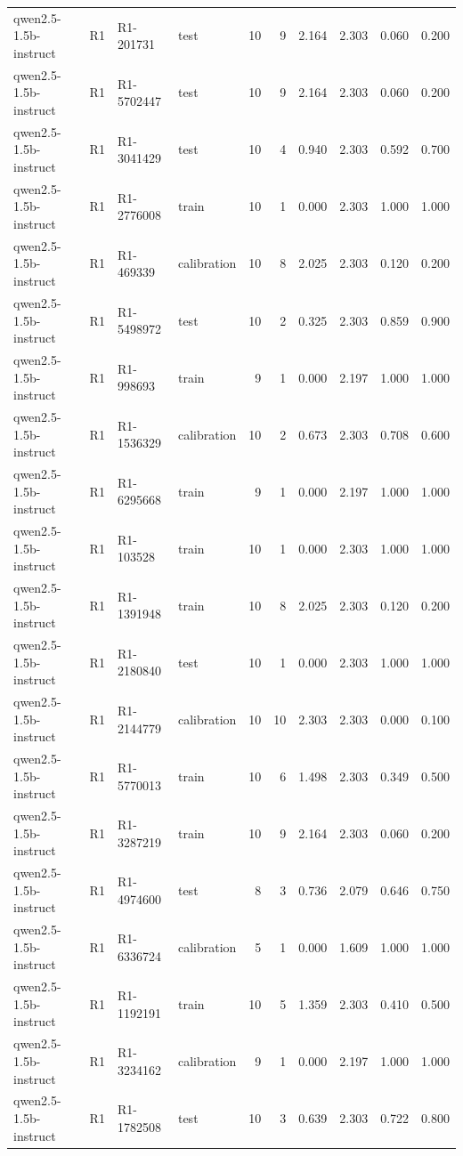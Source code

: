 \begin{table}
\begin{tabular}{llllrrrrrr}
qwen2.5-1.5b-instruct & R1 & R1-201731 & test & 10 & 9 & 2.164 & 2.303 & 0.060 & 0.200 \\
qwen2.5-1.5b-instruct & R1 & R1-5702447 & test & 10 & 9 & 2.164 & 2.303 & 0.060 & 0.200 \\
qwen2.5-1.5b-instruct & R1 & R1-3041429 & test & 10 & 4 & 0.940 & 2.303 & 0.592 & 0.700 \\
qwen2.5-1.5b-instruct & R1 & R1-2776008 & train & 10 & 1 & 0.000 & 2.303 & 1.000 & 1.000 \\
qwen2.5-1.5b-instruct & R1 & R1-469339 & calibration & 10 & 8 & 2.025 & 2.303 & 0.120 & 0.200 \\
qwen2.5-1.5b-instruct & R1 & R1-5498972 & test & 10 & 2 & 0.325 & 2.303 & 0.859 & 0.900 \\
qwen2.5-1.5b-instruct & R1 & R1-998693 & train & 9 & 1 & 0.000 & 2.197 & 1.000 & 1.000 \\
qwen2.5-1.5b-instruct & R1 & R1-1536329 & calibration & 10 & 2 & 0.673 & 2.303 & 0.708 & 0.600 \\
qwen2.5-1.5b-instruct & R1 & R1-6295668 & train & 9 & 1 & 0.000 & 2.197 & 1.000 & 1.000 \\
qwen2.5-1.5b-instruct & R1 & R1-103528 & train & 10 & 1 & 0.000 & 2.303 & 1.000 & 1.000 \\
qwen2.5-1.5b-instruct & R1 & R1-1391948 & train & 10 & 8 & 2.025 & 2.303 & 0.120 & 0.200 \\
qwen2.5-1.5b-instruct & R1 & R1-2180840 & test & 10 & 1 & 0.000 & 2.303 & 1.000 & 1.000 \\
qwen2.5-1.5b-instruct & R1 & R1-2144779 & calibration & 10 & 10 & 2.303 & 2.303 & 0.000 & 0.100 \\
qwen2.5-1.5b-instruct & R1 & R1-5770013 & train & 10 & 6 & 1.498 & 2.303 & 0.349 & 0.500 \\
qwen2.5-1.5b-instruct & R1 & R1-3287219 & train & 10 & 9 & 2.164 & 2.303 & 0.060 & 0.200 \\
qwen2.5-1.5b-instruct & R1 & R1-4974600 & test & 8 & 3 & 0.736 & 2.079 & 0.646 & 0.750 \\
qwen2.5-1.5b-instruct & R1 & R1-6336724 & calibration & 5 & 1 & 0.000 & 1.609 & 1.000 & 1.000 \\
qwen2.5-1.5b-instruct & R1 & R1-1192191 & train & 10 & 5 & 1.359 & 2.303 & 0.410 & 0.500 \\
qwen2.5-1.5b-instruct & R1 & R1-3234162 & calibration & 9 & 1 & 0.000 & 2.197 & 1.000 & 1.000 \\
qwen2.5-1.5b-instruct & R1 & R1-1782508 & test & 10 & 3 & 0.639 & 2.303 & 0.722 & 0.800 \\

\end{tabular}
\end{table}
